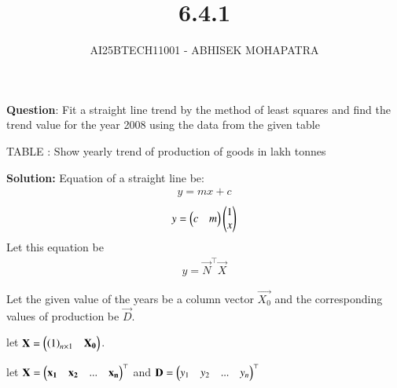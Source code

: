\documentclass[journal,12pt,onecolumn]{IEEEtran}
\begin{document}
\title{6.4.1}
\author{AI25BTECH11001 - ABHISEK MOHAPATRA}
{\let\newpage\relax\maketitle}
	
	 	\textbf{Question}:
		Fit a straight line trend by the method of least squares and find the trend value for
the year 2008 using the data from the given table


TABLE : Show yearly trend of production of goods in lakh tonnes
\begin{table}[H]
\centering
	
	\caption*{}
	\label{10}
\end{table}



		\textbf{Solution:}
		Equation of a straight line be:
		\begin{align}
				y =  mx + c
		\end{align}
		\begin{align}
				y = \begin{pmatrix}c&m\end{pmatrix}\begin{pmatrix}1\\x\end{pmatrix}
		\end{align}
		Let this equation be 
		\begin{align}
				y = \vec{N}^\top\vec{X}
		\end{align}

		Let the given value of the years be a column vector $\vec{X_0}$ and the corresponding values of production be $\vec{D}$.


		let $\mathbf{X} = \begin{pmatrix}\left(1\right)_{n\times 1}&\mathbf{X_0}\end{pmatrix}$. 

		
		let $\mathbf{X} = \begin{pmatrix}\mathbf{x_1}&\mathbf{x_2}&...&\mathbf{x_n}\end{pmatrix}^\top$
		and $\mathbf{D} = \begin{pmatrix}y_1&y_2&...&y_n\end{pmatrix}^\top$
		
\end{document}
